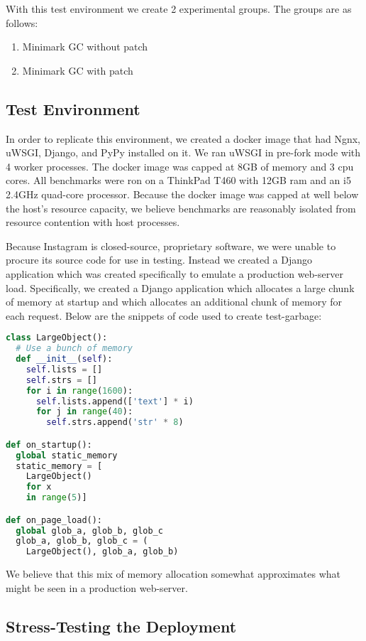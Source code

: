 \documentclass{article}
\begin{document}
With this test environment we create 2 experimental groups.  The groups are as follows:

\begin{enumerate}
    \item Minimark GC without patch
    \item Minimark GC with patch
\end{enumerate}

\subsection{Test Environment}

In order to replicate this environment, we created a docker image that had Ngnx, uWSGI, Django, and PyPy installed on it.  We ran uWSGI in pre-fork mode with 4 worker processes.  The docker image was capped at 8GB of memory and 3 cpu cores.  All benchmarks were ron on a ThinkPad T460 with 12GB ram and an i5 2.4GHz quad-core processor.  Because the docker image was capped at well below the host's resource capacity, we believe benchmarks are reasonably isolated from resource contention with host processes.

Because Instagram is closed-source, proprietary software, we were unable to procure its source code for use in testing.  Instead we created a Django application which was created specifically to emulate a production web-server load.  Specifically, we created a Django application which allocates a large chunk of memory at startup and which allocates an additional chunk of memory for each request.  Below are the snippets of code used to create test-garbage:

\begin{lstlisting}[language=python]
class LargeObject():
  # Use a bunch of memory
  def __init__(self):
    self.lists = []
    self.strs = []
    for i in range(1600):
      self.lists.append(['text'] * i)
      for j in range(40):
        self.strs.append('str' * 8)

def on_startup():
  global static_memory
  static_memory = [
    LargeObject()
    for x
    in range(5)]

def on_page_load():
  global glob_a, glob_b, glob_c
  glob_a, glob_b, glob_c = (
    LargeObject(), glob_a, glob_b)
\end{lstlisting}

We believe that this mix of memory allocation somewhat approximates what might be seen in a production web-server.  

\subsection{Stress-Testing the Deployment}
\end{document}
